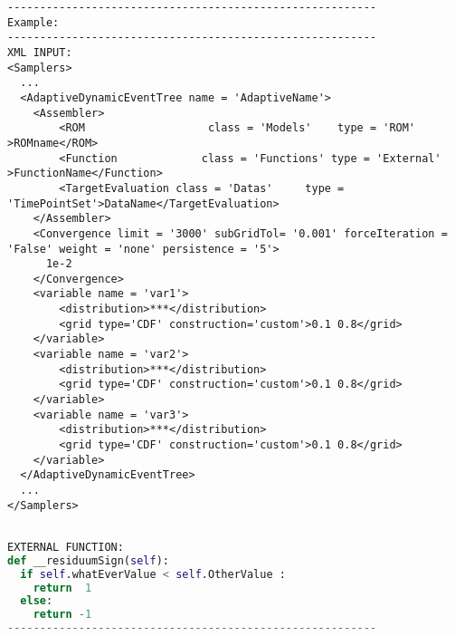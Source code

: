 \begin{lstlisting}[style=XML]
---------------------------------------------------------
Example:
---------------------------------------------------------
XML INPUT:
<Samplers>
  ...
  <AdaptiveDynamicEventTree name = 'AdaptiveName'>
    <Assembler>
        <ROM                   class = 'Models'    type = 'ROM'            >ROMname</ROM>
        <Function             class = 'Functions' type = 'External'      >FunctionName</Function>
        <TargetEvaluation class = 'Datas'     type = 'TimePointSet'>DataName</TargetEvaluation>
    </Assembler>
    <Convergence limit = '3000' subGridTol= '0.001' forceIteration = 'False' weight = 'none' persistence = '5'>
      1e-2
    </Convergence>
    <variable name = 'var1'>
        <distribution>***</distribution>
        <grid type='CDF' construction='custom'>0.1 0.8</grid>
    </variable>
    <variable name = 'var2'>
        <distribution>***</distribution>
        <grid type='CDF' construction='custom'>0.1 0.8</grid>
    </variable>
    <variable name = 'var3'>
        <distribution>***</distribution>
        <grid type='CDF' construction='custom'>0.1 0.8</grid>
    </variable>
  </AdaptiveDynamicEventTree>
  ...
</Samplers>
\end{lstlisting} 
\begin{lstlisting}[language=python]

EXTERNAL FUNCTION:
def __residuumSign(self):
  if self.whatEverValue < self.OtherValue : 
    return  1
  else: 
    return -1
---------------------------------------------------------
\end{lstlisting} 

























